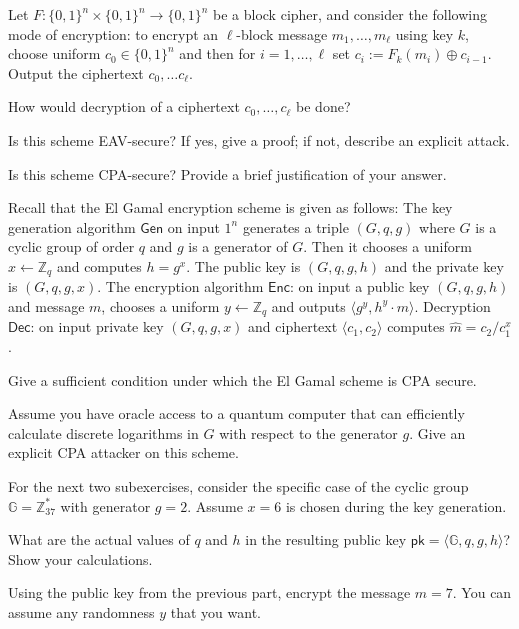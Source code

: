 \documentclass[a4paper,10pt,landscape,twocolumn]{scrartcl}
\begin{document}
\begin{exercise}
Let $F : \{0, 1\}^n \times \{0, 1\}^n \rightarrow \{0, 1\}^n$ be a block cipher, and consider the
following mode of encryption: to encrypt an $\ell$-block message $m_1, \ldots , m_{\ell}$ using key $k$,
choose uniform $c_0 \in \{0, 1\}^n$ and then for $i = 1,  \ldots , \ell$ set $c_i := F_k(m_i) \oplus c_{i-1}$. Output
the ciphertext $c_0 , \ldots c_{\ell}$.
\begin{subex}
How would decryption of a ciphertext $c_0,  \ldots , c_{\ell}$ be done?
\end{subex}
\begin{subex}
Is this scheme EAV-secure? If yes, give a proof; if not, describe an explicit attack.
\end{subex}
\begin{subex}
Is this scheme CPA-secure? Provide a brief justification of your answer.
\end{subex}
\end{exercise}


\begin{exercise}
Recall that the El Gamal encryption scheme is given as follows:
The key generation algorithm $\mathsf{Gen}$ on input $1^n$ generates a triple $(G, q, g)$ where $G$ is a cyclic group of order $q$ and $g$ is a generator of $G$. Then it chooses a uniform $x \leftarrow \mathbb{Z}_q$ and computes $h = g^x$. The public key is $(G, q,g,h)$ and the private key is $(G, q,g,x)$.
The encryption algorithm $\mathsf{Enc}$: on input a public key $(G, q,g, h)$ and message $m$, chooses a uniform $y \leftarrow \mathbb{Z}_q$ and outputs $\langle g^y, h^y \cdot m\rangle. $ 
Decryption $\mathsf{Dec}$: on input private key $(G, q,g,x)$ and ciphertext $\langle c_1, c_2\rangle$ computes $ \hat{m} = c_2 / c_1^x$. 

\begin{subex}
Give a sufficient condition under which the El Gamal scheme is CPA secure.
\end{subex}

\begin{subex}
Assume you have oracle access to a quantum computer that can
efficiently calculate discrete logarithms in $G$ with respect to the
generator $g$. Give an explicit CPA attacker on this scheme.
\end{subex}

\medskip
For the next two subexercises, consider the specific case of the cyclic group $\mathbb{G}=\mathbb{Z}_{37}^*$ with generator $g=2$. Assume $x=6$ is chosen during the key generation.
\begin{subex}
  What are the actual values of $q$ and $h$ in the resulting public key $\mathsf{pk}=\langle \mathbb{G},q,g,h \rangle$? Show your calculations.
\end{subex}

\begin{subex}
  Using the public key from the previous part, encrypt the message $m = 7$. You can assume any randomness $y$ that you want.
\end{subex}

\end{exercise}
\end{document}
